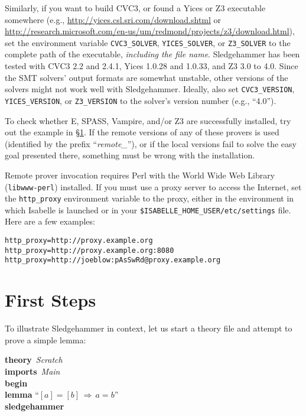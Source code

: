 \documentclass[a4paper,12pt]{article}
\begin{document}
\begin{sloppy}
\begin{enum}
Similarly, if you want to build CVC3, or found a
Yices or Z3 executable somewhere (e.g.,
\url{http://yices.csl.sri.com/download.shtml} or
\url{http://research.microsoft.com/en-us/um/redmond/projects/z3/download.html}),
set the environment variable \texttt{CVC3\_\allowbreak SOLVER},
\texttt{YICES\_SOLVER}, or \texttt{Z3\_SOLVER} to the complete path of
the executable, \emph{including the file name}.
Sledgehammer has been tested with CVC3 2.2 and 2.4.1,
Yices 1.0.28 and 1.0.33, and Z3 3.0 to 4.0. Since the SMT solvers' output
formats are somewhat unstable, other versions of the solvers might not work well
with Sledgehammer. Ideally, also set \texttt{CVC3\_VERSION},
\texttt{YICES\_VERSION}, or \texttt{Z3\_VERSION} to the solver's version number
(e.g., ``4.0'').
\end{enum}
\end{sloppy}

To check whether E, SPASS, Vampire, and/or Z3 are successfully installed, try
out the example in \S\ref{first-steps}. If the remote versions of any of these
provers is used (identified by the prefix ``\emph{remote\_\/}''), or if the
local versions fail to solve the easy goal presented there, something must be
wrong with the installation.

Remote prover invocation requires Perl with the World Wide Web Library
(\texttt{libwww-perl}) installed. If you must use a proxy server to access the
Internet, set the \texttt{http\_proxy} environment variable to the proxy, either
in the environment in which Isabelle is launched or in your
\texttt{\$ISABELLE\_HOME\_USER/etc/settings} file. Here are a few
examples:

\prew
\texttt{http\_proxy=http://proxy.example.org} \\
\texttt{http\_proxy=http://proxy.example.org:8080} \\
\texttt{http\_proxy=http://joeblow:pAsSwRd@proxy.example.org}
\postw

\section{First Steps}
\label{first-steps}

To illustrate Sledgehammer in context, let us start a theory file and
attempt to prove a simple lemma:

\prew
\textbf{theory}~\textit{Scratch} \\
\textbf{imports}~\textit{Main} \\
\textbf{begin} \\[2\smallskipamount]
%
\textbf{lemma} ``$[a] = [b] \,\Longrightarrow\, a = b$'' \\
\textbf{sledgehammer}
\postw
\end{document}
